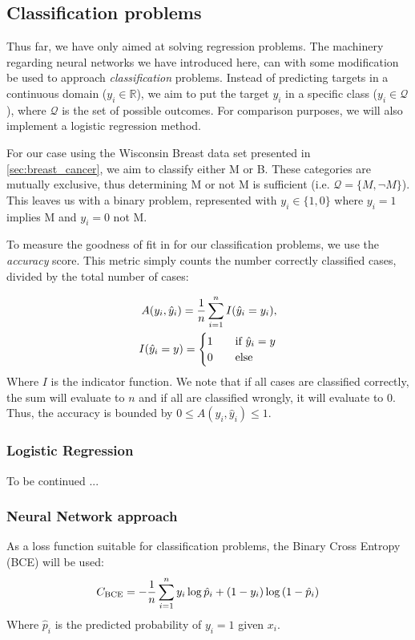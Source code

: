 
\subsection{Classification problems}
    Thus far, we have only aimed at solving regression problems. The machinery regarding neural networks we have introduced here, can with some modification be used to approach \textit{classification} problems. Instead of predicting targets in a continuous domain ($y_i \in \mathbb{R}$), we aim to put the target $y_i$ in a specific class ($y_i \in \mathcal{Q}$), where $\mathcal{Q}$ is the set of possible outcomes. For comparison purposes, we will also implement a logistic regression method.

    For our case using the Wisconsin Breast data set presented in \cref{sec:breast_cancer}, we aim to classify either M or B. These categories are mutually exclusive, thus determining M or not M is sufficient (i.e. $\mathcal{Q} = \{ M, \neg M \}$). This leaves us with a binary problem, represented with $y_i \in \{ 1, 0 \}$ where $y_i = 1$ implies M and $y_i = 0$ not M.

    To measure the goodness of fit in for our classification problems, we use the \textit{accuracy} score. This metric simply counts the number correctly classified cases, divided by the total number of cases:

    \begin{align}
        A(y_i, \hat{y}_i) = \frac{1}{n}\sum_{i=1}^{n} I(\hat{y}_i = y_i), \\
        I(\hat{y}_i = y) = \begin{cases}
            1\hspace{10px}&\text{if }\hat{y}_i = y \\
            0\hspace{10px}&\text{else}
        \end{cases} \nonumber
    \end{align}
    Where $I$ is the indicator function. We note that if all cases are classified correctly, the sum will evaluate to $n$ and if all are classified wrongly, it will evaluate to 0. Thus, the accuracy is bounded by $0 \leq A(y_i, \hat{y}_i) \leq 1$.

    \subsubsection*{Logistic Regression}
    To be continued ...

    \subsubsection*{Neural Network approach}
    As a loss function suitable for classification problems, the Binary Cross Entropy (BCE) \cite{BCE} will be used:
    \begin{align}
        {C}_\text{BCE} = -\frac{1}{n}\sum_{i=1}^{n} y_i \log{\hat{p}_i} + (1-y_i) \log{(1-\hat{p}_i)}
        \label{eq:BCE_loss_function}
    \end{align} 
    Where $\hat{p}_i$ is the predicted probability of $y_i = 1$ given $x_i$.  